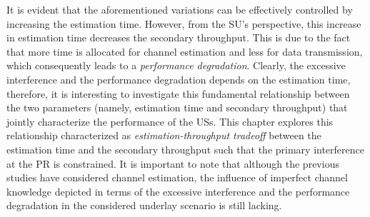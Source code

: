 It is evident that the aforementioned variations can be effectively controlled by increasing the estimation time. However, from the SU's perspective, this increase in estimation time decreases the secondary throughput. This is due to the fact that more time is allocated for channel estimation and less for data transmission, which consequently leads to a \textit{performance degradation}. 
Clearly, the excessive interference and the performance degradation depends on the estimation time, therefore, it is interesting to investigate this fundamental relationship between the two parameters (namely, estimation time and secondary throughput) that jointly characterize the performance of the USs. %
  This chapter explores this relationship characterized as \textit{estimation-throughput tradeoff} between the estimation time and the secondary throughput such that the primary interference at the PR is constrained. It is important to note that although the previous studies \cite{Musa09, Suraweera10, Kim12} have considered channel estimation, the influence of imperfect channel knowledge depicted in terms of the excessive interference and the performance degradation in the considered underlay scenario is still lacking. 
 

